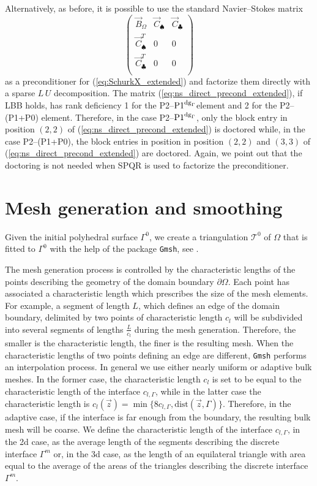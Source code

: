 \documentclass[a4paper,12pt,onecolumn]{article}
\newcommand{\pdg}{${\rm P1}^{{\rm dg}_\Gamma}$} %
\begin{document}
Alternatively, as before, it is possible to use the standard Navier--Stokes
matrix
\begin{equation}\label{eq:ns_direct_precond_extended}
\begin{pmatrix}
\vec B_\Omega & \vec C_\spadesuit & \vec C_\clubsuit \\
\vec C^T_\spadesuit & 0 & 0 \\
\vec C^T_\clubsuit & 0 & 0 \\
\end{pmatrix}
\end{equation}
as a preconditioner for (\ref{eq:SchurkX_extended}) and factorize them directly
with a sparse $L\,U$ decomposition. The matrix
(\ref{eq:ns_direct_precond_extended}), if LBB holds, has rank deficiency 1
for the P2--\pdg element and 2 for the P2--(P1+P0) element. Therefore, in the
case P2--\pdg, only the block entry in position $(2,2)$ of
(\ref{eq:ns_direct_precond_extended}) is doctored while, in the case
P2--(P1+P0), the block entries in position in position $(2,2)$ and $(3,3)$ of
(\ref{eq:ns_direct_precond_extended}) are doctored. Again, we point out
that the doctoring is not needed when SPQR is used to factorize the
preconditioner.

\section{Mesh generation and smoothing}\label{sec:smoothing}
Given the initial polyhedral surface $\Gamma^0$, we create a triangulation
$\mathcal{T}^0$ of $\Omega$ that is fitted to $\Gamma^0$ with the help of the
package \verb|Gmsh|, see \cite{GeuzaineR09}.

The mesh generation process is controlled by the characteristic lengths of the
points describing the geometry of the domain boundary $\partial\Omega$. Each
point has associated a characteristic length which prescribes the size of the
mesh elements. For example, a segment of length $L$, which defines an edge of
the domain boundary, delimited by two points of characteristic length $c_l$ will
be subdivided into several segments of lengths $\frac{L}{c_l}$ during the mesh
generation. Therefore, the smaller is the characteristic length, the finer is
the resulting mesh. When the characteristic lengths of two points defining an
edge are different, \verb|Gmsh| performs an interpolation process. In general we
use either nearly uniform or adaptive bulk meshes. In the former case, the
characteristic length $c_l$ is set to be equal to the characteristic length of
the interface $c_{l,\Gamma}$, while in the latter case the characteristic
length is $c_l(\vec z)=\min\{8c_{l,\Gamma},\mbox{dist}(\vec z,\Gamma)\}$.
Therefore, in the adaptive case, if the interface is far enough from the
boundary, the resulting bulk mesh will be coarse. We define the characteristic
length of the interface $c_{l,\Gamma}$, in the 2d case, as the average length
of the segments describing the discrete interface $\Gamma^m$ or, in the 3d
case, as the length of an equilateral triangle with area equal to the average
of the areas of the triangles describing the discrete interface $\Gamma^m$.
\end{document}
